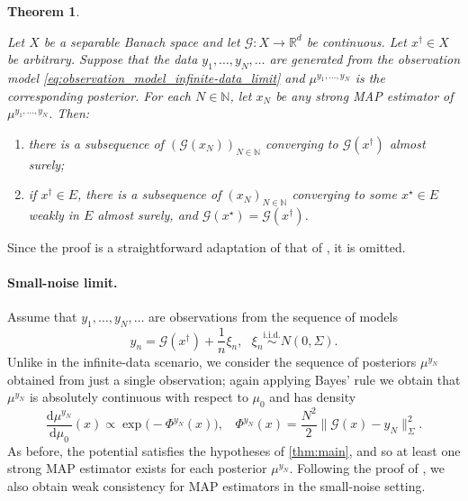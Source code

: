 \documentclass[11pt]{article}
\newcommand*{\Naturals}{\mathbb{N}}
\newcommand*{\rd}{\mathrm{d}}
\newcommand*{\Reals}{\mathbb{R}}
\theoremstyle{plain}
\newtheorem{theorem}{Theorem}[section]
\theoremstyle{definition}
\newcommand{\norm}[1]{\lVert #1 \rVert}
\numberwithin{equation}{section}
\numberwithin{figure}{section}
\numberwithin{table}{section}
\begin{document}
\begin{theorem}
	\label{thm:consistency_infinite-data_limit}

	Let $X$ be a separable Banach space and let $\mathcal{G} \colon X \to \Reals^{d}$ be continuous. 
	Let $x^{\dagger} \in X$ be arbitrary.
	Suppose that the data $y_{1}, \dots, y_{N}, \dots$ are generated from the observation model \eqref{eq:observation_model_infinite-data_limit} and $\mu^{y_{1}, \dots, y_{N}}$ is the corresponding posterior. 
	For each $N \in \Naturals$, let $x_{N}$ be any strong MAP estimator of $\mu^{y_{1}, \dots, y_{N}}$.
	Then:
	\begin{enumerate}[label=(\alph*)]
		\item there is a subsequence of $(\mathcal{G}(x_{N}))_{N \in \Naturals}$ converging to $\mathcal{G}(x^{\dagger})$ almost surely; 
		\item if $x^{\dagger} \in E$, there is a subsequence of $(x_{N})_{N \in \Naturals}$ converging to some $x^{\star} \in E$ weakly in $E$ almost surely, and $\mathcal{G}(x^{\star}) = \mathcal{G}(x^{\dagger})$.
	\end{enumerate}
\end{theorem}

Since the proof is a straightforward adaptation of that of \citet{DashtiLawStuartVoss2013}, it is omitted.

\paragraph{Small-noise limit.}
Assume that $y_{1}, \dots, y_{N}, \dots$ are observations from the sequence of models
\begin{equation} \label{eq:observation_model_small-noise_limit}
	y_{n} = \mathcal{G}(x^{\dagger}) + \frac{1}{n} \xi_{n},~~~\xi_{n} \overset{\text{i.i.d.}}{\sim} N(0, \Sigma).
\end{equation}
Unlike in the infinite-data scenario, we consider the sequence of posteriors $\mu^{y_{N}}$ obtained from just a single observation;
again applying Bayes' rule we obtain that $\mu^{y_{N}}$ is absolutely continuous with respect to $\mu_{0}$ and has density
\begin{equation*}
	\frac{\rd \mu^{y_{N}}}{\rd \mu_{0}}(x) \propto \exp\bigl(-\Phi^{y_{N}}(x)\bigr),~~~~\Phi^{y_{N}}(x) = \frac{N^{2}}{2} \norm{\mathcal{G}(x) - y_{N}}_{\Sigma}^{2}.
\end{equation*}
As before, the potential satisfies the hypotheses of \cref{thm:main}, and so at least one strong MAP estimator exists for each posterior $\mu^{y_{N}}$.
Following the proof of \citet[Theorem~4.4 and Corollary~4.5]{DashtiLawStuartVoss2013}, we also obtain weak consistency for MAP estimators in the small-noise setting.
\end{document}
